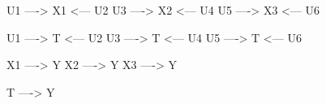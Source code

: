 U1 ----> X1 <--- U2
    U3 ----> X2 <--- U4
    U5 ----> X3 <--- U6

    U1 ----> T <--- U2
    U3 ----> T <--- U4
    U5 ----> T <--- U6

    X1 ----> Y
    X2 ----> Y
    X3 ----> Y

    T ----> Y